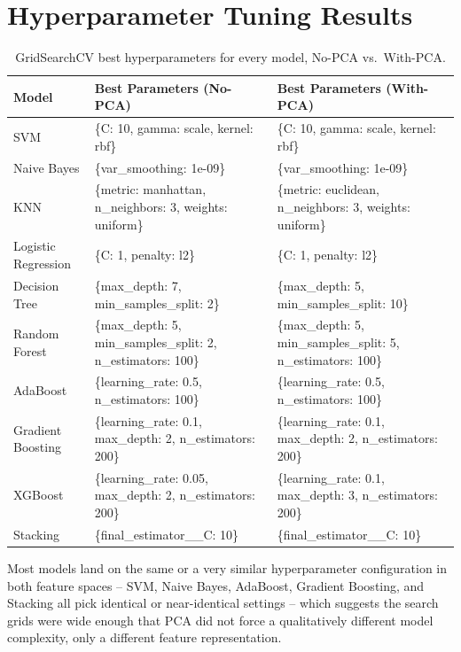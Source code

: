 \documentclass[11pt,a4paper]{article}
\begin{document}
\section{Hyperparameter Tuning Results}
\begin{table}[h]
\centering
\small
\begin{tabular}{@{}p{2.7cm}p{5.3cm}p{5.3cm}@{}}
\toprule
Model & Best Parameters (No-PCA) & Best Parameters (With-PCA) \\
\midrule
SVM & \{C: 10, gamma: scale, kernel: rbf\} & \{C: 10, gamma: scale, kernel: rbf\} \\
Naive Bayes & \{var\_smoothing: 1e-09\} & \{var\_smoothing: 1e-09\} \\
KNN & \{metric: manhattan, n\_neighbors: 3, weights: uniform\} & \{metric: euclidean, n\_neighbors: 3, weights: uniform\} \\
Logistic Regression & \{C: 1, penalty: l2\} & \{C: 1, penalty: l2\} \\
Decision Tree & \{max\_depth: 7, min\_samples\_split: 2\} & \{max\_depth: 5, min\_samples\_split: 10\} \\
Random Forest & \{max\_depth: 5, min\_samples\_split: 2, n\_estimators: 100\} & \{max\_depth: 5, min\_samples\_split: 5, n\_estimators: 100\} \\
AdaBoost & \{learning\_rate: 0.5, n\_estimators: 100\} & \{learning\_rate: 0.5, n\_estimators: 100\} \\
Gradient Boosting & \{learning\_rate: 0.1, max\_depth: 2, n\_estimators: 200\} & \{learning\_rate: 0.1, max\_depth: 2, n\_estimators: 200\} \\
XGBoost & \{learning\_rate: 0.05, max\_depth: 2, n\_estimators: 200\} & \{learning\_rate: 0.1, max\_depth: 3, n\_estimators: 200\} \\
Stacking & \{final\_estimator\_\_C: 10\} & \{final\_estimator\_\_C: 10\} \\
\bottomrule
\end{tabular}
\caption{GridSearchCV best hyperparameters for every model, No-PCA vs.\ With-PCA.}
\end{table}
Most models land on the same or a very similar hyperparameter configuration in both feature spaces -- SVM, Naive Bayes, AdaBoost, Gradient Boosting, and Stacking all pick identical or near-identical settings -- which suggests the search grids were wide enough that PCA did not force a qualitatively different model complexity, only a different feature representation.

\end{document}
